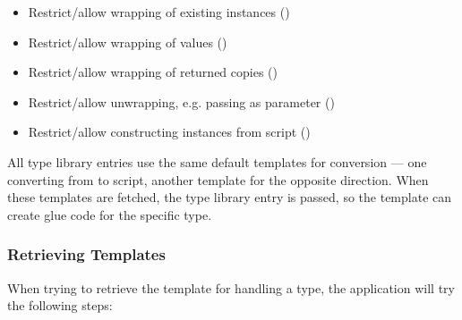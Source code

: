 \vspace{-10pt}
\begin{itemize}\addtolength{\itemsep}{-0.5\baselineskip}
\item Restrict/allow wrapping of existing instances ()
\item Restrict/allow wrapping of  values ()
\item Restrict/allow wrapping of returned copies ()
\item Restrict/allow unwrapping, e.g. passing as parameter ()
\item Restrict/allow constructing instances from script ()
\end{itemize}
\vspace{-10pt}

All type library entries use the same default templates for conversion --- one converting from  to script, another template for the opposite direction. When these templates are fetched, the type library entry is passed, so the template can create glue code for the specific type.

\subsubsection{Retrieving Templates}

When trying to retrieve the template for handling a type, the application will try the following steps:

